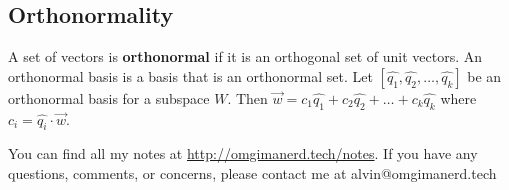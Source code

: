 \documentclass{math}
\begin{document}
\subsection*{Orthonormality}
A set of vectors is \textbf{orthonormal} if it is an orthogonal set of unit
vectors. An orthonormal basis is a basis that is an orthonormal set. Let
\( [\hat{q_1},\hat{q_2},\dots,\hat{q_k}] \) be an orthonormal basis for a
subspace \( W \). Then \( \vec{w} = c_1\hat{q_1}+c_2\hat{q_2}+\dots+
c_k\hat{q_k} \) where \( c_i = \hat{q_i}\cdot\vec{w} \).

\begin{center}
  You can find all my notes at \url{http://omgimanerd.tech/notes}. If you have
  any questions, comments, or concerns, please contact me at
  alvin@omgimanerd.tech
\end{center}
\end{document}
